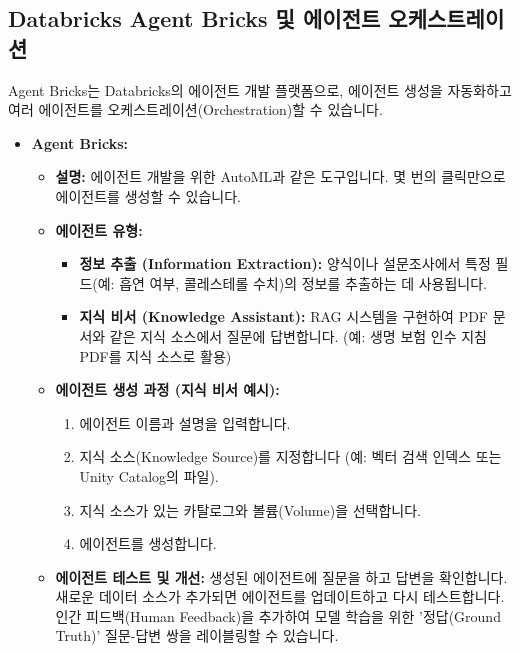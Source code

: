\documentclass[11pt,a4paper]{article}
\begin{document}
\subsection{Databricks Agent Bricks 및 에이전트 오케스트레이션}

Agent Bricks는 Databricks의 에이전트 개발 플랫폼으로, 에이전트 생성을 자동화하고 여러 에이전트를 오케스트레이션(Orchestration)할 수 있습니다.

\begin{itemize}
    \item \textbf{Agent Bricks:}
    \begin{itemize}
        \item \textbf{설명:} 에이전트 개발을 위한 AutoML과 같은 도구입니다. 몇 번의 클릭만으로 에이전트를 생성할 수 있습니다.
        \item \textbf{에이전트 유형:}
        \begin{itemize}
            \item \textbf{정보 추출 (Information Extraction):} 양식이나 설문조사에서 특정 필드(예: 흡연 여부, 콜레스테롤 수치)의 정보를 추출하는 데 사용됩니다.
            \item \textbf{지식 비서 (Knowledge Assistant):} RAG 시스템을 구현하여 PDF 문서와 같은 지식 소스에서 질문에 답변합니다. (예: 생명 보험 인수 지침 PDF를 지식 소스로 활용)
        \end{itemize}
        \item \textbf{에이전트 생성 과정 (지식 비서 예시):}
        \begin{enumerate}
            \item 에이전트 이름과 설명을 입력합니다.
            \item 지식 소스(Knowledge Source)를 지정합니다 (예: 벡터 검색 인덱스 또는 Unity Catalog의 파일).
            \item 지식 소스가 있는 카탈로그와 볼륨(Volume)을 선택합니다.
            \item 에이전트를 생성합니다.
        \end{enumerate}
        \item \textbf{에이전트 테스트 및 개선:} 생성된 에이전트에 질문을 하고 답변을 확인합니다. 새로운 데이터 소스가 추가되면 에이전트를 업데이트하고 다시 테스트합니다. 인간 피드백(Human Feedback)을 추가하여 모델 학습을 위한 '정답(Ground Truth)' 질문-답변 쌍을 레이블링할 수 있습니다.
    \end{itemize}


\end{itemize}
\end{document}
